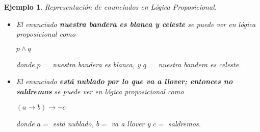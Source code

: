 \documentclass[letterpaper,12pt]{article}
\newtheorem{ejem}{Ejemplo}[]
\begin{document}
    \begin{ejem} 
        Representación de enunciados en Lógica Proposicional.
        \begin{itemize}
            \item[i)] El enunciado \textbf{nuestra bandera es blanca y celeste} se
            puede ver en lógica proposicional como 
            \begin{center}
                $p \land q$
            \end{center}
            donde $p =$ nuestra bandera es blanca, y $q =$ nuestra bandera es
            celeste.
            
            \item[ii)] El enunciado \textbf{está nublado por lo que va a llover;
            entonces no saldremos} se puede ver en lógica proposicional como 
            \begin{center}
                $(a \rightarrow b) \rightarrow \neg c$
            \end{center}
            donde $a =$ está nublado, $b =$ va a llover y $c =$ saldremos.
        \end{itemize}
    \end{ejem}

\end{document}
